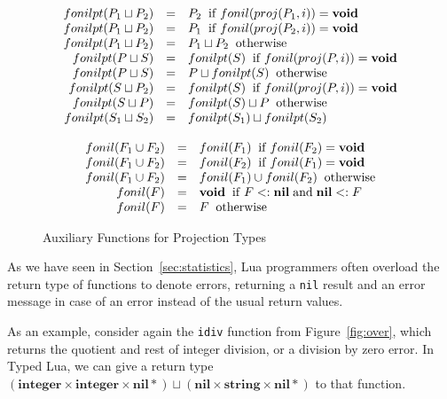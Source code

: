 \documentclass[10pt]{sigplanconf}
\newcommand{\Nil}{\mathbf{nil}}
\newcommand{\Integer}{\mathbf{integer}}
\newcommand{\String}{\mathbf{string}}
\newcommand{\subtype}{<:}
\begin{document}
\begin{figure}[t]
{\scriptsize
\label{fig:projtypes}
\[
\begin{array}{c}
\begin{array}{rcl}
fonilpt(P_1 \sqcup P_2) & = & P_2 \;\; \mathrm{if} \; fonil(proj(P_1, i)) = {\bf void} \\
fonilpt(P_1 \sqcup P_2) & = & P_1 \;\; \mathrm{if} \; fonil(proj(P_2, i)) = {\bf void} \\
fonilpt(P_1 \sqcup P_2) & = & P_1 \sqcup P_2 \;\; \mathrm{otherwise}\\
fonilpt(P \sqcup S) & = & fonilpt(S) \;\; \mathrm{if} \; fonil(proj(P, i)) = {\bf void} \\
fonilpt(P \sqcup S) & = & P \sqcup fonilpt(S) \;\; \mathrm{otherwise}\\
fonilpt(S \sqcup P_2) & = & fonilpt(S) \;\; \mathrm{if} \; fonil(proj(P, i)) = {\bf void} \\
fonilpt(S \sqcup P) & = & fonilpt(S) \sqcup P \;\; \mathrm{otherwise}\\
fonilpt(S_1 \sqcup S_2) & = & fonilpt(S_1) \sqcup fonilpt(S_2)
\end{array}\\\\
\begin{array}{rcl}
fonil(F_1 \cup F_2) & = & fonil(F_1) \;\; \mathrm{if}\;fonil(F_2) = {\bf void}\\
fonil(F_1 \cup F_2) & = & fonil(F_2) \;\; \mathrm{if}\;fonil(F_1) = {\bf void}\\
fonil(F_1 \cup F_2) & = & fonil(F_1) \cup fonil(F_2) \;\; \mathrm{otherwise}\\
fonil(F) & = & {\bf void} \;\; \mathrm{if} \; F \subtype \Nil \; \mathrm{and} \; \Nil \subtype F\\
fonil(F) & = & F \;\; \mathrm{otherwise}
\end{array}
\end{array}
\]}
\caption{Auxiliary Functions for Projection Types}
\end{figure}

As we have seen in Section~\ref{sec:statistics}, Lua
programmers often overload the return type of functions
to denote errors, returning a {\tt nil} result and
an error message in case of an error instead of the
usual return values.

As an example, consider again the {\tt idiv} function
from Figure~\ref{fig:over}, which returns the quotient and rest of integer division, or a division by zero error. In Typed Lua, we can give a return type $(\Integer \times \Integer \times \Nil*) \sqcup (\Nil \times \String \times \Nil{*})$ to that function. 
\end{document}
